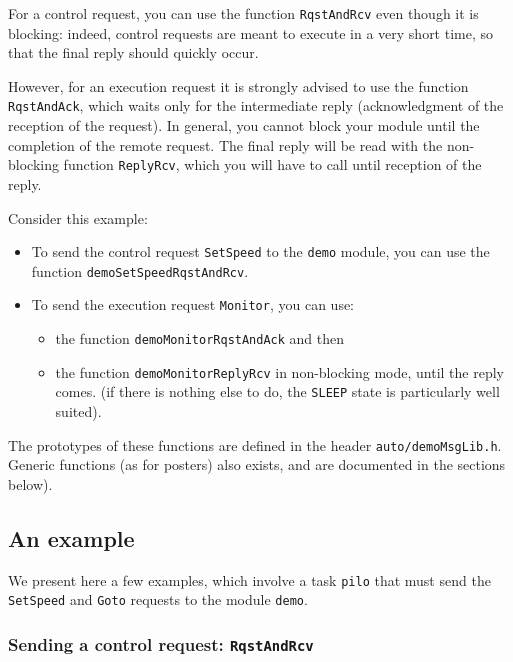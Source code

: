 For a  control request, you  can use  the function  \texttt{RqstAndRcv} even
though it is blocking: indeed, control requests are meant to execute in a
very short time, so that the final reply should quickly occur.

However, for  an  execution request it   is strongly advised   to use the
function \texttt{RqstAndAck}, which waits only  for the  intermediate reply
(acknowledgment of the reception of the request).  In general, you cannot
block your module until the completion of the  remote request.  The final
reply will be  read with the  non-blocking function \texttt{ReplyRcv}, which
you will have to call until reception of the reply.

Consider this example:

\begin{itemize}
\item To send the control request \texttt{SetSpeed} to  the \texttt{demo}
module, you can use the function \texttt{demoSetSpeedRqstAndRcv}.

\item To send the execution request \texttt{Monitor}, you can use:
   \begin{itemize}
      \item the function \texttt{demoMonitorRqstAndAck} and then
      \item the function \texttt{demoMonitorReplyRcv} in non-blocking mode,
until the reply comes. (if there is nothing else to do, the \texttt{SLEEP}
state is particularly well suited).
   \end{itemize}
\end{itemize}

The prototypes  of  these  functions  are defined   in the  header   
\texttt{auto/demoMsgLib.h}. Generic functions  (as for posters) also exists,
and are documented in the sections below).

\subsection{An example}

We  present here a few  examples, which involve  a task \texttt{pilo} that
must send  the \texttt{SetSpeed} and   \texttt{Goto}  requests  to the
module \texttt{demo}. 

\subsubsection{Sending a control request: \texttt{RqstAndRcv}}

